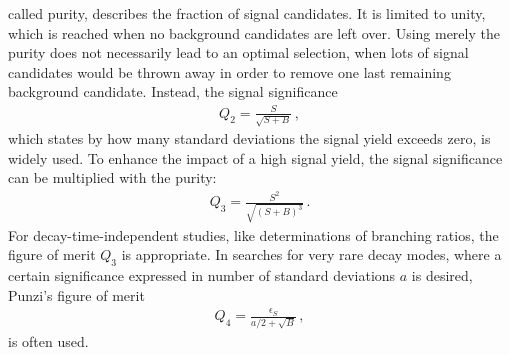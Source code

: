called purity, describes the fraction of signal candidates. It is limited to
unity, which is reached when no background candidates are left over. Using
merely the purity does not necessarily lead to an optimal selection, \eg when
lots of signal candidates would be thrown away in order to remove one last
remaining background candidate. Instead, the signal significance
\begin{align}
	Q_2 = \frac{S}{\sqrt{S + B}}\,,
\end{align}
which states by how many standard deviations the signal yield exceeds zero, is
widely used. To enhance the impact of a high signal yield, the signal
significance can be multiplied with the purity:
\begin{align}
	Q_3 = \frac{S^2}{\sqrt{(S + B)^3}}\,.
\end{align}
For decay-time-independent studies, like determinations of branching ratios,
the figure of merit $Q_3$ is appropriate. In searches for very rare decay
modes, where a certain significance expressed in number of standard deviations
$a$ is desired, Punzi's figure of merit~\cite{Punzi:2003bu}
\begin{align}
	Q_4 = \frac{\epsilon_S}{a/2 + \sqrt{B}}\,,
\end{align}
is often used.

